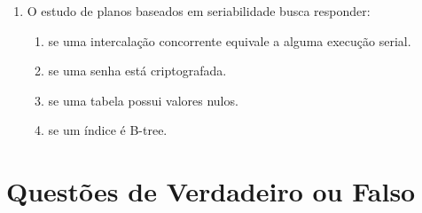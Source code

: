 \documentclass[12pt,a4paper]{article}
\begin{document}
\begin{enumerate}[label=\textbf{Q\arabic*.}]
\begin{enumerate}[label=\alph*)]
    \item se o plano permite recuperação correta diante de abortos ou falhas.
    \item se uma tabela está em BCNF.
    \item se uma consulta possui \texttt{GROUP BY}.
    \item se uma chave é composta.
\end{enumerate}

\item O estudo de planos baseados em seriabilidade busca responder:

\begin{enumerate}[label=\alph*)]
    \item se uma intercalação concorrente equivale a alguma execução serial.
    \item se uma senha está criptografada.
    \item se uma tabela possui valores nulos.
    \item se um índice é B-tree.
\end{enumerate}

\end{enumerate}

\section{Questões de Verdadeiro ou Falso}
\end{document}
